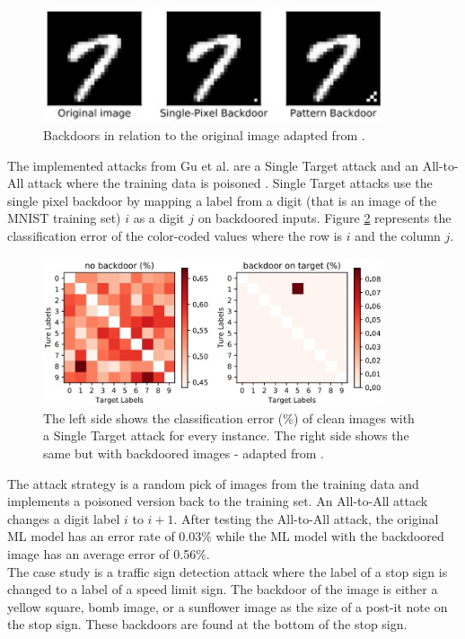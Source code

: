 \begin{figure}[ht!]
  \centering
  \includegraphics[width=10cm]{pictures/backdoor_pattern_bad_net.jpg}
  \caption{Backdoors in relation to the original image adapted from \cite{DBLP:journals/corr/abs-1708-06733}.}
  \label{fig:backdoor_pattern}
\end{figure}

The implemented attacks from Gu et al. are a Single Target attack and an All-to-All attack where the training data is poisoned \cite{DBLP:conf/ccs/HuangJNRT11}. Single Target attacks use the single pixel backdoor by mapping a label from a digit (that is an image of the MNIST \cite{LeCun1995LearningAF} training set) $i$ as a digit $j$ on backdoored inputs. Figure \ref{fig:mapped_from_i_to_j} represents the classification error of the color-coded values where the row is $i$ and the column $j$.

\begin{figure}[ht!]
  \centering
  \includegraphics[width=10cm]{pictures/mapping_from_i_to_j.jpg}
  \caption{The left side shows the classification error (\%) of clean images with a Single Target attack for every instance. The right side shows the same but with backdoored images - adapted from \cite{DBLP:journals/corr/abs-1708-06733}.}
  \label{fig:mapped_from_i_to_j}
\end{figure}

The attack strategy is a random pick of images from the training data and implements a poisoned version back to the training set. An All-to-All attack changes a digit label $i$ to $i + 1$. After testing the All-to-All attack, the original ML model has an error rate of 0.03\% while the ML model with the backdoored image has an average error of 0.56\%. \\ The case study is a traffic sign detection attack where the label of a stop sign is changed to a label of a speed limit sign. The backdoor of the image is either a yellow square, bomb image, or a sunflower image as the size of a post-it note on the stop sign. These backdoors are found at the bottom of the stop sign.

